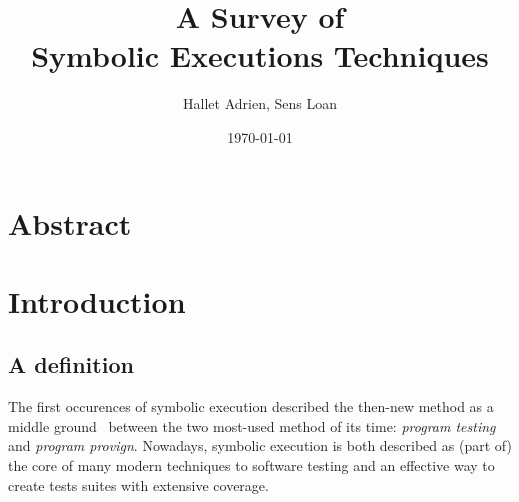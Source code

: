 \documentclass[11pt]{IEEEtran}
\begin{document}
\title{A Survey of\\Symbolic Executions Techniques} %
\author{Hallet Adrien, Sens Loan}
\date{\today}
\maketitle

  \section*{Abstract}

  \section{Introduction}
    \subsection{A definition}
      The first occurences of symbolic execution described the then-new method as a middle ground~\cite{newapproach} between the two most-used method of its time: \emph{program testing} and \emph{program provign}.
      Nowadays, symbolic execution is both described as (part of) the core of many modern techniques to software testing\cite{chopper:icse18} and an effective way to create tests suites with extensive coverage.\cite{threedecadeslater}
\end{document}
